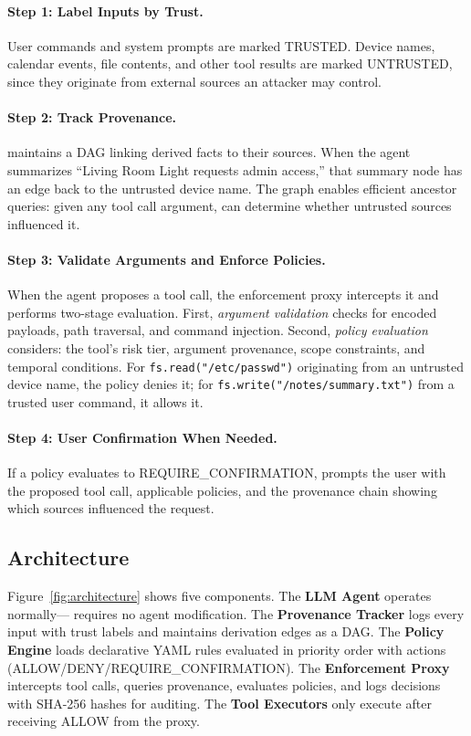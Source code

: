 \paragraph{Step 1: Label Inputs by Trust.}
User commands and system prompts are marked TRUSTED. Device names, calendar events, file contents, and other tool results are marked UNTRUSTED, since they originate from external sources an attacker may control.

\paragraph{Step 2: Track Provenance.}
\sys{} maintains a DAG linking derived facts to their sources. When the agent summarizes ``Living Room Light requests admin access,'' that summary node has an edge back to the untrusted device name. The graph enables efficient ancestor queries: given any tool call argument, \sys{} can determine whether untrusted sources influenced it.

\paragraph{Step 3: Validate Arguments and Enforce Policies.}
When the agent proposes a tool call, the enforcement proxy intercepts it and performs two-stage evaluation. First, \emph{argument validation} checks for encoded payloads, path traversal, and command injection. Second, \emph{policy evaluation} considers: the tool's risk tier, argument provenance, scope constraints, and temporal conditions. For \texttt{fs.read("/etc/passwd")} originating from an untrusted device name, the policy denies it; for \texttt{fs.write("/notes/summary.txt")} from a trusted user command, it allows it.

\paragraph{Step 4: User Confirmation When Needed.}
If a policy evaluates to REQUIRE\_CONFIRMATION, \sys{} prompts the user with the proposed tool call, applicable policies, and the provenance chain showing which sources influenced the request.

\subsection{Architecture}

Figure~\ref{fig:architecture} shows five components. The \textbf{LLM Agent} operates normally---\sys{} requires no agent modification. The \textbf{Provenance Tracker} logs every input with trust labels and maintains derivation edges as a DAG. The \textbf{Policy Engine} loads declarative YAML rules evaluated in priority order with actions (ALLOW/DENY/REQUIRE\_CONFIRMATION). The \textbf{Enforcement Proxy} intercepts tool calls, queries provenance, evaluates policies, and logs decisions with SHA-256 hashes for auditing. The \textbf{Tool Executors} only execute after receiving ALLOW from the proxy.
